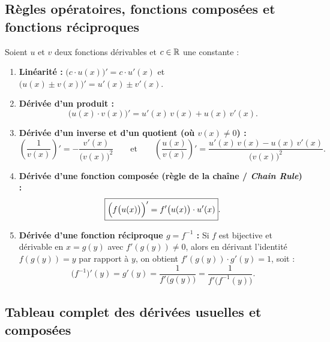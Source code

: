 \subsection{Règles opératoires, fonctions composées et fonctions réciproques}

\begin{theoreme}
Soient $u$ et $v$ deux fonctions dérivables et $c \in \mathbb{R}$ une constante :
\begin{enumerate}
    \item \textbf{Linéarité :} $\bigl(c\cdot u(x)\bigr)' = c\cdot u'(x)$ \quad et \quad $\bigl(u(x) \pm v(x)\bigr)' = u'(x) \pm v'(x)$.
    \item \textbf{Dérivée d'un produit :}
    \[
        \boxed{\bigl(u(x) \cdot v(x)\bigr)' = u'(x)\,v(x) + u(x)\,v'(x)}.
    \]
    \item \textbf{Dérivée d'un inverse et d'un quotient (où $v(x) \neq 0$) :}
    \[
        \boxed{\left(\frac{1}{v(x)}\right)' = -\frac{v'(x)}{\bigl(v(x)\bigr)^2}} \qquad \text{et} \qquad \boxed{\left(\frac{u(x)}{v(x)}\right)' = \frac{u'(x)\,v(x) - u(x)\,v'(x)}{\bigl(v(x)\bigr)^2}}.
    \]
    \item \textbf{Dérivée d'une fonction composée (règle de la chaîne / \emph{Chain Rule}) :}
    \[
        \boxed{\Bigl(f\bigl(u(x)\bigr)\Bigr)' = f'\bigl(u(x)\bigr) \cdot u'(x)}.
    \]
    \item \textbf{Dérivée d'une fonction réciproque $g = f^{-1}$ :} Si $f$ est bijective et dérivable en $x = g(y)$ avec $f'(g(y)) \neq 0$, alors en dérivant l'identité $f(g(y)) = y$ par rapport à $y$, on obtient $f'(g(y))\cdot g'(y) = 1$, soit :
    \[
        \boxed{\bigl(f^{-1}\bigr)'(y) = g'(y) = \frac{1}{f'\bigl(g(y)\bigr)} = \frac{1}{f'\bigl(f^{-1}(y)\bigr)}}.
    \]
\end{enumerate}
\end{theoreme}

\subsection{Tableau complet des dérivées usuelles et composées}

